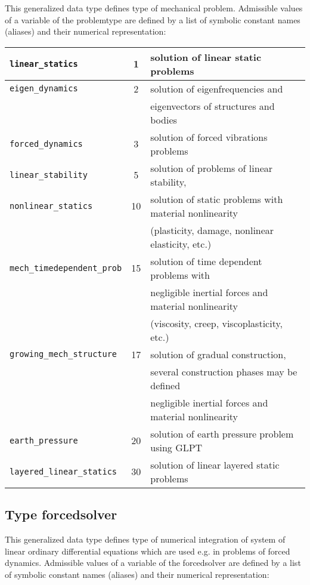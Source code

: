 This generalized data type defines type of mechanical problem.
Admissible values of a variable of the {\sf problemtype} are defined by a list of symbolic constant names (aliases)
and their numerical representation:

\begin{center}
\begin{tabular}{|l|c|l|}
\hline
{\tt linear\_statics} & 1 & solution of linear static problems
\\[2mm] \hline
{\tt eigen\_dynamics} & 2 & solution of eigenfrequencies and
\\
 & & eigenvectors of structures and bodies
\\[2mm] \hline
{\tt forced\_dynamics} & 3 & solution of forced vibrations problems
\\[2mm] \hline
{\tt linear\_stability} & 5 & solution of problems of linear stability,
\\[2mm] \hline
{\tt nonlinear\_statics} & 10 & solution of static problems with material nonlinearity
\\
 & & (plasticity, damage, nonlinear elasticity, etc.)
\\ \hline
{\tt mech\_timedependent\_prob} & 15 & solution of time dependent problems with
\\
 & & negligible inertial forces and material nonlinearity
\\
 & & (viscosity, creep, viscoplasticity, etc.)
\\ \hline
{\tt growing\_mech\_structure} & 17 & solution of gradual construction,
\\
 & & several construction phases may be defined
\\
 & & negligible inertial forces and material nonlinearity
\\ \hline
{\tt earth\_pressure} & 20 & solution of earth pressure problem using GLPT
\\ \hline
{\tt layered\_linear\_statics} & 30 & solution of linear layered static problems
\\ \hline
\end{tabular}
\end{center}


\subsection{Type {\sf forcedsolver}}
\label{sectforcedsolver}

This generalized data type defines type of numerical integration of system of linear ordinary differential equations
which are used e.g. in problems of forced dynamics.
Admissible values of a variable of the {\sf forcedsolver} are defined by a list of symbolic constant names (aliases)
and their numerical representation:


